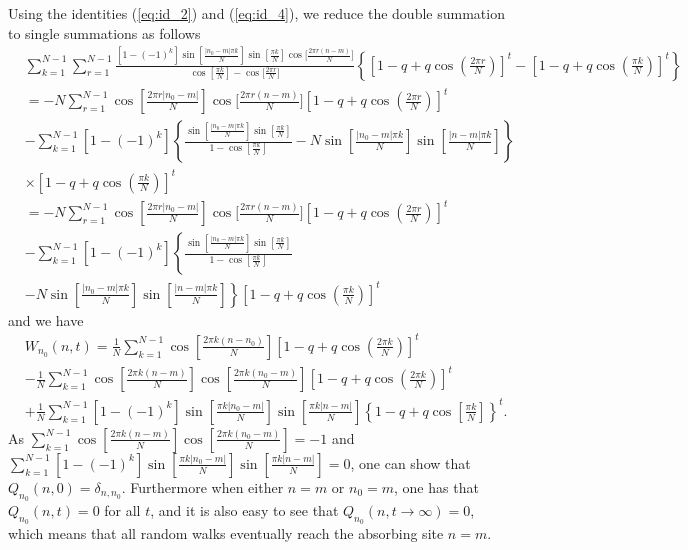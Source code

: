 \documentclass[10pt, hidelinks, superscriptaddress, amsmath, amssymb, aps, pre]{revtex4-2}
\begin{document}
Using the identities (\ref{eq:id_2}) and (\ref{eq:id_4}), we reduce the double summation to single summations as follows
\begin{align}
&\sum_{k=1}^{N-1}\sum_{r=1}^{N-1}\frac{\left[1-(-1)^k\right]\sin\left[\frac{|n_0-m|\pi k}{N}\right]\sin\left[\frac{\pi k}{N}\right]\cos\Big[\frac{2\pi r (n-m)}{N}\Big]}{\cos\left[\frac{\pi k}{N}\right]-\cos\Big[\frac{2\pi r}{N}\Big]}\left\{\left[1-q+q\cos\left(\frac{2\pi r}{N}\right)\right]^t-\left[1-q+q\cos\left(\frac{\pi k}{N}\right)\right]^t\right\} \nonumber \\
&=-N\sum_{r=1}^{N-1}\cos\left[\frac{2\pi r|n_0-m|}{N}\right]\cos\Big[\frac{2\pi r (n-m)}{N}\Big]\left[1-q+q\cos\left(\frac{2\pi r}{N}\right)\right]^t \nonumber \\
&-\sum_{k=1}^{N-1}\left[1-(-1)^k\right]\left\{\frac{\sin\left[\frac{|n_0-m|\pi k}{N}\right]\sin\left[\frac{\pi k}{N}\right]}{1-\cos\left[\frac{\pi k}{N}\right]}-N\sin\left[\frac{|n_0-m|\pi k}{N}\right]\sin\left[\frac{|n-m|\pi k}{N}\right]\right\}\nonumber \\
&\times \left[1-q+q\cos\left(\frac{\pi k}{N}\right)\right]^t\nonumber \\
&=-N\sum_{r=1}^{N-1}\cos\left[\frac{2\pi r|n_0-m|}{N}\right]\cos\Big[\frac{2\pi r (n-m)}{N}\Big]\left[1-q+q\cos\left(\frac{2\pi r}{N}\right)\right]^t \nonumber \\
&-\sum_{k=1}^{N-1}\left[1-(-1)^k\right]\left\{\frac{\sin\left[\frac{|n_0-m|\pi k}{N}\right]\sin\left[\frac{\pi k}{N}\right]}{1-\cos\left[\frac{\pi k}{N}\right]}\right. \nonumber \\
&\left.-N\sin\left[\frac{|n_0-m|\pi k }{N}\right]\sin\left[\frac{|n-m|\pi k}{N}\right]\right\}\left[1-q+q\cos\left(\frac{\pi k }{N}\right)\right]^t
\end{align}
and we have
\begin{align}
&W_{n_0}(n,t)= \frac{1}{N}\sum_{k=1}^{N-1}\cos\left[\frac{2\pi k (n-n_0)}{N}\right]\left[1-q+q\cos\left(\frac{2\pi k}{N}\right)\right]^t \nonumber \\
&-   \frac{1}{N}\sum_{k=1}^{N-1}\cos\left[\frac{2\pi k (n-m)}{N}\right]\cos\left[\frac{2\pi k (n_0-m)}{N}\right]\left[1-q+q\cos\left(\frac{2\pi k}{N}\right)\right]^t\    \nonumber \\
&+\frac{1}{N}\sum_{k=1}^{N-1}\left[1-(-1)^k\right]\sin\left[\frac{\pi k |n_0-m|}{N}\right]\sin\left[\frac{\pi k |n-m|}{N}\right]\left\{1-q+q\cos\left[\frac{ \pi k}{N}\right]\right\}^t.
\label{eq:prob-time}
\end{align}
As $\sum_{k=1}^{N-1}\cos\left[\frac{2\pi k (n-m)}{N}\right]\cos\left[\frac{2\pi k (n_0-m)}{N}\right]=-1$ and $\sum_{k=1}^{N-1}\left[1-(-1)^k\right]\sin\left[\frac{\pi k |n_0-m|}{N}\right]\sin\left[\frac{\pi k |n-m|}{N}\right]=0$, one can show that $Q_{n_0}(n,0)=\delta_{n,n_0}$. Furthermore when either $n=m$ or $n_0=m$, one has that $Q_{n_0}(n,t)=0$ for all $t$, and it is also easy to see that $Q_{n_0}(n,t\to \infty)=0$, which means that all random walks eventually reach the absorbing site $n=m$.
\end{document}
